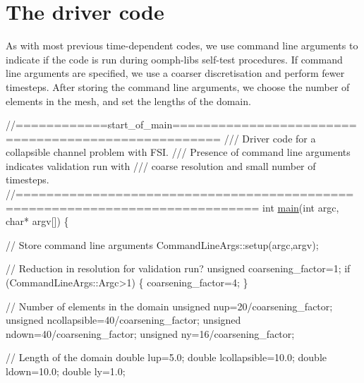  

\hypertarget{index_main}{}\section{The driver code}\label{index_main}
As with most previous time-\/dependent codes, we use command line arguments to indicate if the code is run during {\ttfamily oomph-\/lib\textquotesingle{}s} self-\/test procedures. If command line arguments are specified, we use a coarser discretisation and perform fewer timesteps. After storing the command line arguments, we choose the number of elements in the mesh, and set the lengths of the domain.

 
\begin{DoxyCodeInclude}
\textcolor{comment}{//============start\_of\_main====================================================}
\textcolor{comment}{/// Driver code for a collapsible channel problem with FSI.}
\textcolor{comment}{}\textcolor{comment}{/// Presence of command line arguments indicates validation run with }
\textcolor{comment}{}\textcolor{comment}{/// coarse resolution and small number of timesteps.}
\textcolor{comment}{}\textcolor{comment}{//=============================================================================}
\textcolor{keywordtype}{int} \hyperlink{fsi__collapsible__channel_8cc_a0ddf1224851353fc92bfbff6f499fa97}{main}(\textcolor{keywordtype}{int} argc, \textcolor{keywordtype}{char}* argv[])
\{

 \textcolor{comment}{// Store command line arguments}
 CommandLineArgs::setup(argc,argv);
  
 \textcolor{comment}{// Reduction in resolution for validation run?}
 \textcolor{keywordtype}{unsigned} coarsening\_factor=1;
 \textcolor{keywordflow}{if} (CommandLineArgs::Argc>1)
  \{
   coarsening\_factor=4;
  \}

 \textcolor{comment}{// Number of elements in the domain}
 \textcolor{keywordtype}{unsigned} nup=20/coarsening\_factor;
 \textcolor{keywordtype}{unsigned} ncollapsible=40/coarsening\_factor;
 \textcolor{keywordtype}{unsigned} ndown=40/coarsening\_factor;
 \textcolor{keywordtype}{unsigned} ny=16/coarsening\_factor;

 \textcolor{comment}{// Length of the domain}
 \textcolor{keywordtype}{double} lup=5.0;
 \textcolor{keywordtype}{double} lcollapsible=10.0;
 \textcolor{keywordtype}{double} ldown=10.0;
 \textcolor{keywordtype}{double} ly=1.0;

\end{DoxyCodeInclude}


